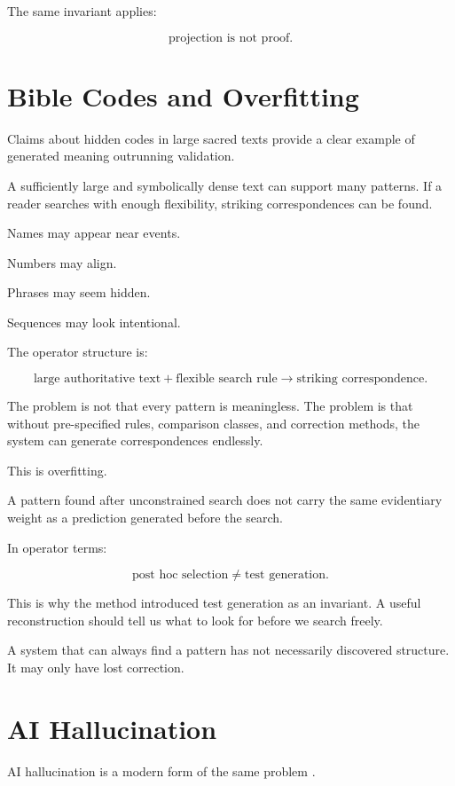 \documentclass[11pt]{book}
\begin{document}
The same invariant applies:

\[
\text{projection is not proof}.
\]

\section{Bible Codes and Overfitting}

Claims about hidden codes in large sacred texts provide a clear example of generated meaning outrunning validation.

A sufficiently large and symbolically dense text can support many patterns. If a reader searches with enough flexibility, striking correspondences can be found.

Names may appear near events.

Numbers may align.

Phrases may seem hidden.

Sequences may look intentional.

The operator structure is:

\[
\text{large authoritative text}
+
\text{flexible search rule}
\rightarrow
\text{striking correspondence}.
\]

The problem is not that every pattern is meaningless. The problem is that without pre-specified rules, comparison classes, and correction methods, the system can generate correspondences endlessly.

This is overfitting.

A pattern found after unconstrained search does not carry the same evidentiary weight as a prediction generated before the search.

In operator terms:

\[
\text{post hoc selection} \neq \text{test generation}.
\]

This is why the method introduced test generation as an invariant. A useful reconstruction should tell us what to look for before we search freely.

A system that can always find a pattern has not necessarily discovered structure. It may only have lost correction.

\section{AI Hallucination}

AI hallucination is a modern form of the same problem \cite{Bender2021StochasticParrots,Weidinger2021EthicalSocialRisks,Cameron2026IPRP}.
\end{document}

